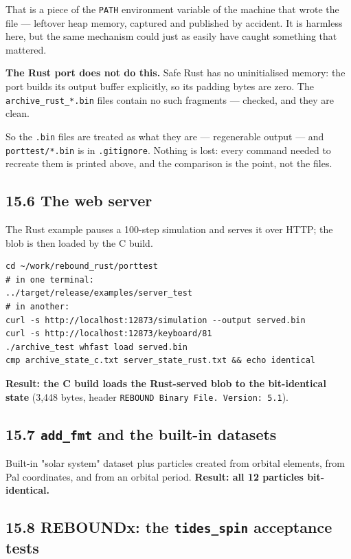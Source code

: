\documentclass[11pt]{article}
\begin{document}
That is a piece of the \texttt{PATH} environment variable of the machine that wrote the file --- leftover heap memory, captured and published by accident. It is harmless here, but the same mechanism could just as easily have caught something that mattered.

\textbf{The Rust port does not do this.} Safe Rust has no uninitialised memory: the port builds its output buffer explicitly, so its padding bytes are zero. The \texttt{archive\_rust\_*.bin} files contain no such fragments --- checked, and they are clean.

So the \texttt{.bin} files are treated as what they are --- regenerable output --- and \texttt{porttest/*.bin} is in \texttt{.gitignore}. Nothing is lost: every command needed to recreate them is printed above, and the comparison is the point, not the files.

\subsection{15.6 The web server}

The Rust example pauses a 100-step simulation and serves it over HTTP; the blob is then loaded by the C build.

\begin{lstlisting}
cd ~/work/rebound_rust/porttest
# in one terminal:
../target/release/examples/server_test
# in another:
curl -s http://localhost:12873/simulation --output served.bin
curl -s http://localhost:12873/keyboard/81
./archive_test whfast load served.bin
cmp archive_state_c.txt server_state_rust.txt && echo identical
\end{lstlisting}

\textbf{Result: the C build loads the Rust-served blob to the bit-identical state} (3,448 bytes, header \texttt{REBOUND Binary File. Version: 5.1}).

\subsection{15.7 \texttt{add\_fmt} and the built-in datasets}

Built-in "solar system" dataset plus particles created from orbital elements, from Pal coordinates, and from an orbital period. \textbf{Result: all 12 particles bit-identical.}

\subsection{15.8 REBOUNDx: the \texttt{tides\_spin} acceptance tests}
\end{document}
